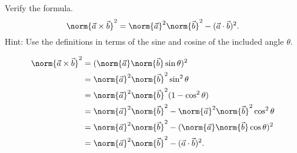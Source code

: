 \begin{exercises}
\begin{problist}
        \prob   Verify the formula.
        \[ 
            \norm{\vec{a} \times \vec{b}}^2 = \norm{\vec{a}}^2 \norm{\vec{b}}^2 - (\vec{a} \cdot
            \vec{b})^2.  
        \] 
        Hint: Use the definitions in terms of the sine and cosine of the included angle $\theta$.
        \begin{solution}
            \begin{align*}
                \norm{\vec{a} \times \vec{b}}^2 &= (\norm{\vec{a}} \norm{\vec{b}}\sin\theta)^2 \\
                                                &= \norm{\vec{a}}^2 \norm{\vec{b}}^2\sin^2\theta \\
                                                &= \norm{\vec{a}}^2 \norm{\vec{b}}^2(1-\cos^2\theta) \\
                                                &= \norm{\vec{a}}^2 \norm{\vec{b}}^2 - \norm{\vec{a}}^2
                \norm{\vec{b}}^2\cos^2\theta \\
                &= \norm{\vec{a}}^2 \norm{\vec{b}}^2 - (\norm{\vec{a}} \norm{\vec{b}}\cos\theta)^2 \\
                &= \norm{\vec{a}}^2 \norm{\vec{b}}^2 - (\vec{a} \cdot\vec{b})^2.
            \end{align*}
        \end{solution}
    \end{problist}
\end{exercises}


